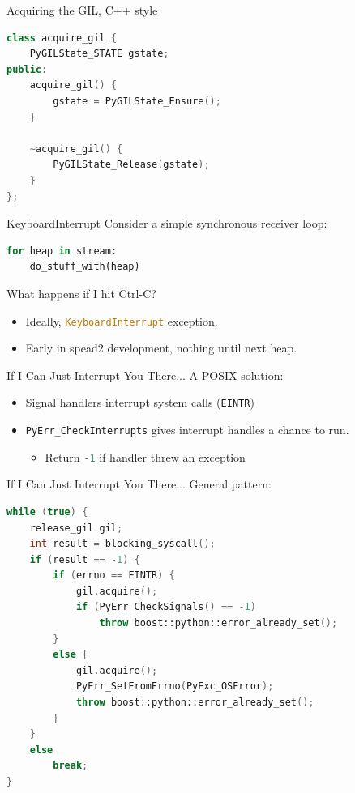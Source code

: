 \documentclass{beamer}
\def\linlinep{\lstinline[basicstyle=\ttfamily,language=python]}
\def\linlinec{\lstinline[basicstyle=\ttfamily,language=c++]}
\begin{document}
\begin{frame}[fragile=singleslide]{Acquiring the GIL, C++ style}
  \begin{lstlisting}[language=c++]
class acquire_gil {
    PyGILState_STATE gstate;
public:
    acquire_gil() {
        gstate = PyGILState_Ensure();
    }

    ~acquire_gil() {
        PyGILState_Release(gstate);
    }
};
  \end{lstlisting}
\end{frame}

\begin{frame}[fragile]{KeyboardInterrupt}
  Consider a simple synchronous receiver loop:
  \begin{lstlisting}[language=python]
for heap in stream:
    do_stuff_with(heap)
  \end{lstlisting}
  What happens if I hit Ctrl-C?
  \begin{itemize}[<+->]
    \item Ideally, \linlinep{KeyboardInterrupt} exception.
    \item Early in spead2 development, \alert{nothing} until next heap.
  \end{itemize}
\end{frame}

\begin{frame}{If I Can Just Interrupt You There...}
  A POSIX solution:
  \begin{itemize}
    \item Signal handlers interrupt system calls (\linlinec"EINTR")
    \item \linlinec"PyErr_CheckInterrupts" gives interrupt handles a chance to
      run.
    \begin{itemize}
      \item Return \linlinec"-1" if handler threw an exception
    \end{itemize}
  \end{itemize}
\end{frame}

\begin{frame}[fragile=singleslide]{If I Can Just Interrupt You There...}
  General pattern:
  \begin{lstlisting}[language=c++]
while (true) {
    release_gil gil;
    int result = blocking_syscall();
    if (result == -1) {
        if (errno == EINTR) {
            gil.acquire();
            if (PyErr_CheckSignals() == -1)
                throw boost::python::error_already_set();
        }
        else {
            gil.acquire();
            PyErr_SetFromErrno(PyExc_OSError);
            throw boost::python::error_already_set();
        }
    }
    else
        break;
}
  \end{lstlisting}
\end{frame}
\end{document}
